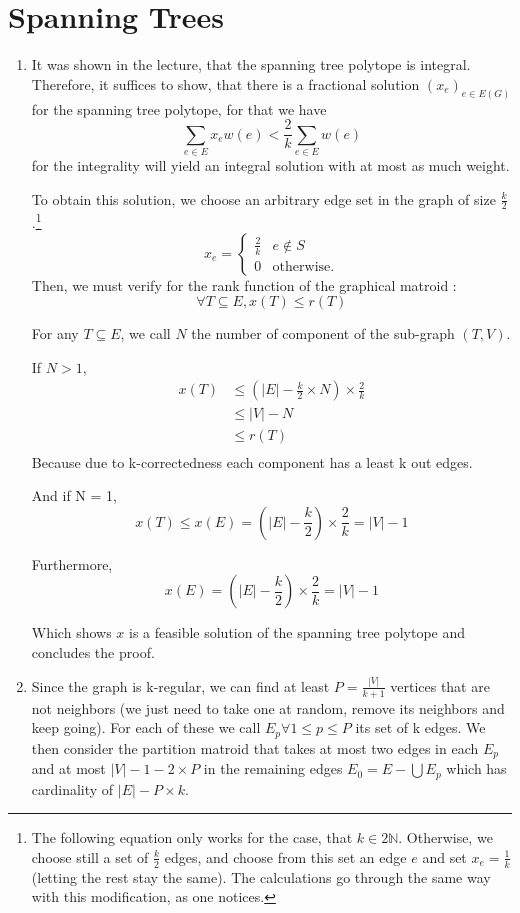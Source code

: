 \documentclass{scrartcl}
\newcommand\1{\mathbf{1}}
\begin{document}
\section{Spanning Trees}
\begin{enumerate}
\item
It was shown in the lecture, that the spanning tree polytope is integral. Therefore, it suffices to show, that there is a fractional solution $(x_e)_{e \in E(G)}$ for the spanning tree polytope, for that we have
\[
\sum_{e \in E} x_e w(e) < \frac{2}{k} \sum_{e \in E} w(e)
\]
for the integrality will yield an integral solution with at most as much weight.

To obtain this solution, we choose an arbitrary edge set in the graph of size $\frac{k}{2}$.\footnote{The following equation only works for the case, that $k\in 2\mathbb{N}$. Otherwise, we choose still a set of $\frac{k}{2}$ edges, and choose from this set an edge $e$ and set $x_e = \frac{1}{k}$ (letting the rest stay the same). The calculations go through the same way with this modification, as one notices.}
\[
x_e = \begin{cases} \frac{2}{k} & e \notin S \\ 0 &\text{otherwise.}\end{cases}
\]
Then, we must verify for the rank function of the graphical matroid :
\[
\forall T \subseteq E, x(T) \leq r(T)
\]

For any $T\subseteq E$, we call $N$ the number of component of the sub-graph $(T,V)$.

If $N > 1$,
\begin{align*}
x(T) &\leq (|E| - \frac{k}{2} \times N ) \times\frac{2}{k} \\
&\leq |V| - N \\
&\leq r(T) \\
\end{align*}
Because due to k-correctedness each component has a least k out edges.

And if N = 1,
\[
x(T) \leq x(E) = (|E| - \frac{k}{2}) \times \frac{2}{k} = |V| - 1
\]

Furthermore,
\[
x(E) = (|E| - \frac{k}{2}) \times \frac{2}{k} = |V| - 1
\]

Which shows $x$ is a feasible solution of the spanning tree polytope and concludes the proof.
\item
Since the graph is k-regular, we can find at least $P = \frac{|V|}{k+1}$ vertices that are not neighbors (we just need to take one at random, remove its neighbors and keep going). For each of these we call $E_p \forall 1 \leq p \leq P$ its set of k edges. We then consider the partition matroid that takes at most two edges in each $E_p$ and at most $|V| - 1 - 2 \times P$ in the remaining edges $E_0 = E-\bigcup E_p$ which has cardinality of $|E| - P \times k$.


\end{enumerate}
\end{document}
